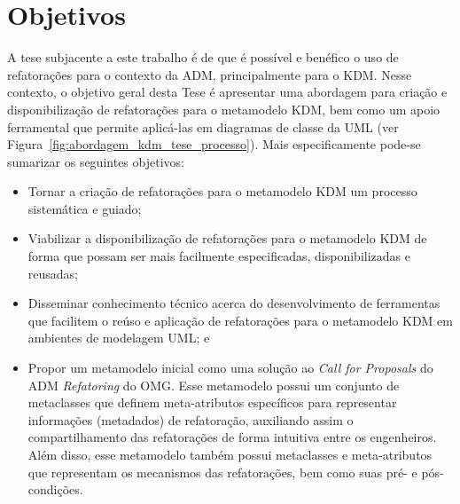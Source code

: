 \section{Objetivos}\label{sec:objetivos}

A tese subjacente a este trabalho é de que é possível e benéfico o uso de refatorações para o contexto da ADM, principalmente para o KDM. Nesse contexto, o objetivo geral desta Tese é apresentar uma abordagem para criação e disponibilização de refatorações para o metamodelo KDM, bem como um apoio ferramental que permite aplicá-las em diagramas de classe da UML (ver Figura~\ref{fig:abordagem_kdm_tese_processo}). Mais especificamente pode-se sumarizar os seguintes objetivos:%

\begin{itemize}

    \item Tornar a criação de refatorações para o metamodelo KDM um processo sistemática e guiado;
    
    \item Viabilizar a disponibilização de refatorações para o metamodelo KDM de forma que possam ser mais facilmente especificadas, disponibilizadas e reusadas;
    
    \item Disseminar conhecimento técnico acerca do desenvolvimento de ferramentas que facilitem o reúso e aplicação de refatorações para o metamodelo KDM em ambientes de modelagem UML; e
    

    \item Propor um metamodelo inicial como uma solução ao \textit{Call for Proposals} do ADM \textit{Refatoring} do OMG. Esse metamodelo possui um conjunto de metaclasses que definem meta-atributos específicos para representar informações (metadados) de refatoração, auxiliando assim o compartilhamento das refatorações de forma intuitiva entre os engenheiros. Além disso, esse metamodelo também possui metaclasses e meta-atributos que representam os mecanismos das refatorações, bem como suas pré- e pós-condições.

	
	

\end{itemize}
